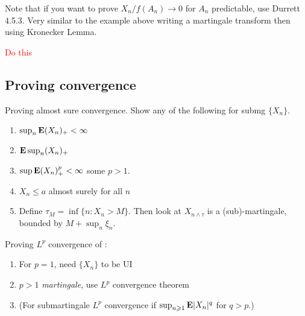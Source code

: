 \documentclass{article}
\newcommand\myworries[1]{\textcolor{red}{#1}}
\begin{document}
Note that if you want to prove $X_n/f(A_n) \to 0$ for $A_n$ predictable, use Durrett 4.5.3. Very similar to the example above writing a martingale transform then using Kronecker Lemma. 

\begin{theorem}
\myworries{Do this}
\end{theorem}




\subsection{Proving convergence}
Proving almost sure convergence. Show any of the following for submg $\{X_n\}$.
\begin{enumerate}
	\item $\sup_n \mathbf{E}(X_n)_+ <\infty$
	\item $\mathbf{E} \sup_n (X_n)_+$
	\item $\sup \mathbf{E}(X_n)_+^p<\infty$ some $p>1$. 
	\item $X_n \leq a$ almost surely for all $n$
	\item Define $\tau_M = \inf\{n: X_n >M\}$. Then look at $X_{n\wedge \tau}$ is a (sub)-martingale, bounded by $M + \sup_{n} \xi_n$. 
\end{enumerate}
Proving $L^p$ convergence of :
\begin{enumerate}
	\item For $p=1$, need $\{X_n\}$ to be UI
	\item $p>1$ \textit{martingale}, use $L^p$ convergence theorem
	\item (For submartingale $L^p$ convergence if $\sup_{n\geqslant 1} \mathbf{E}|X_n|^q $ for $q>p$.)
\end{enumerate}
\end{document}
